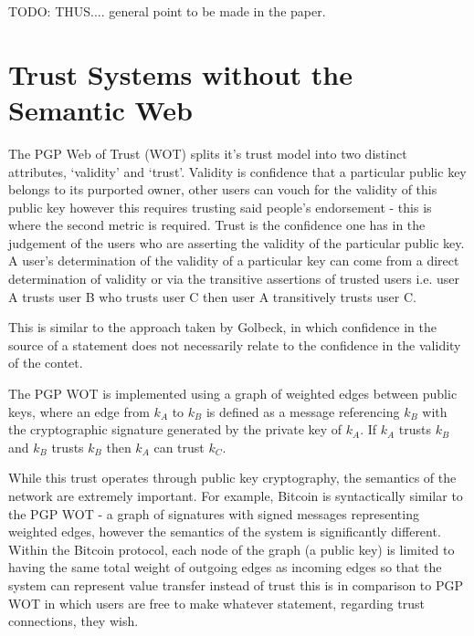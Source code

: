 \documentclass{acm_proc_article-sp}
\begin{document}
TODO: THUS.... general point to be made in the paper.

\section{Trust Systems without the Semantic Web}
The PGP Web of Trust (WOT)\cite{_how_pgp_1999} splits it's trust model into two distinct attributes, `validity' and `trust'.   Validity is confidence that a particular public key belongs to its purported owner, other users can vouch for the validity of this public key however this requires trusting said people's endorsement - this is where the second metric is required.  Trust is the confidence one has in the judgement of the users who are asserting the validity of the particular public key.  A user's determination of the validity of a particular key can come from a direct determination of validity or via the transitive assertions of trusted users i.e. user A trusts user B who trusts user C then user A transitively trusts user C.

This is similar to the approach taken by Golbeck, in which confidence in the source of a statement does not necessarily relate to the confidence in the validity of the contet.

The PGP WOT is implemented using a graph of weighted edges between public keys, where an edge from $k_A$ to $k_B$ is defined as a message referencing $k_B$ with the cryptographic signature generated by the private key of $k_A$. If $k_A$ trusts $k_B$ and $k_B$ trusts $k_B$ then $k_A$ can trust $k_C$.

While this trust operates through public key cryptography, the semantics of the network are extremely important. For example, Bitcoin is syntactically similar to the PGP WOT - a graph of signatures with signed messages representing weighted edges, however the semantics of the system is significantly different\cite{bitcoin}. Within the Bitcoin protocol, each node of the graph (a public key) is limited to having the same total weight of outgoing edges as incoming edges so that the system can represent value transfer instead of trust this is in comparison to PGP WOT in which users are free to make whatever statement, regarding trust connections, they wish.
\end{document}
